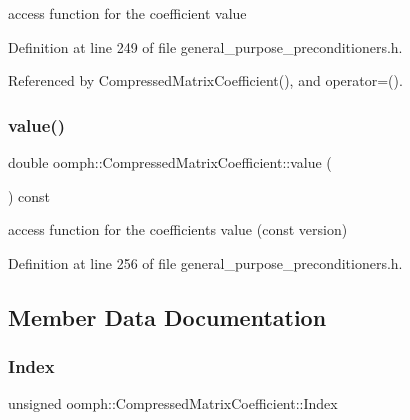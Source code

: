 access function for the coefficient value 



Definition at line 249 of file general\+\_\+purpose\+\_\+preconditioners.\+h.



Referenced by Compressed\+Matrix\+Coefficient(), and operator=().

\mbox{\label{classoomph_1_1CompressedMatrixCoefficient_a8659b8a8c7cb778d337cf58c38a1d24a}} 
\subsubsection{\texorpdfstring{value()}{value()}\hspace{0.1cm}{\footnotesize\ttfamily [2/2]}}
{\footnotesize\ttfamily double oomph\+::\+Compressed\+Matrix\+Coefficient\+::value (\begin{DoxyParamCaption}{ }\end{DoxyParamCaption}) const\hspace{0.3cm}{\ttfamily [inline]}}



access function for the coefficient\textquotesingle{}s value (const version) 



Definition at line 256 of file general\+\_\+purpose\+\_\+preconditioners.\+h.



\subsection{Member Data Documentation}
\mbox{\label{classoomph_1_1CompressedMatrixCoefficient_ac39f53e43e7edaa4ba58274e0ed939c4}} 
\subsubsection{\texorpdfstring{Index}{Index}}
{\footnotesize\ttfamily unsigned oomph\+::\+Compressed\+Matrix\+Coefficient\+::\+Index\hspace{0.3cm}{\ttfamily [private]}}



